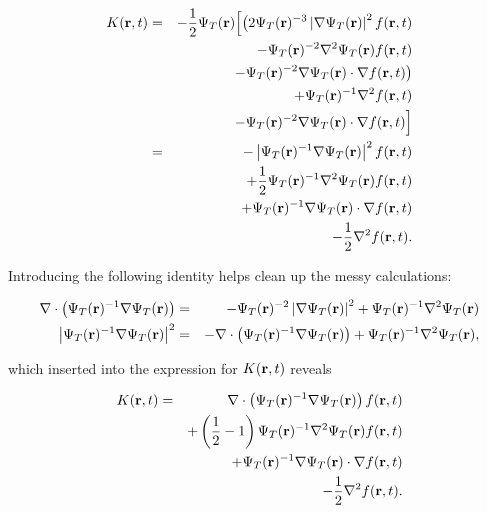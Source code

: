 \begin{eqnarray*}
K(\mathbf{r}, t) &=& -\frac{1}{2}\Psi_T(\mathbf{r})\Big[\big(2\Psi_T(\mathbf{r})^{-3}\left|\nabla\Psi_T(\mathbf{r})\right|^2f(\mathbf{r}, t) \\
        & & - \Psi_T(\mathbf{r})^{-2}\nabla^2\Psi_T(\mathbf{r})f(\mathbf{r}, t) \\
        & & - \Psi_T(\mathbf{r})^{-2}\nabla\Psi_T(\mathbf{r})\cdot\nabla f(\mathbf{r}, t)\big) \\
        & & + \Psi_T(\mathbf{r})^{-1}\nabla^2 f(\mathbf{r}, t) \\
        & & - \Psi_T(\mathbf{r})^{-2}\nabla\Psi_T(\mathbf{r})\cdot\nabla f(\mathbf{r}, t)\Big] \\
        &=& - \left|\Psi_T(\mathbf{r})^{-1}\nabla\Psi_T(\mathbf{r})\right|^2f(\mathbf{r}, t) \\
        & & + \frac{1}{2}\Psi_T(\mathbf{r})^{-1}\nabla^2\Psi_T(\mathbf{r})f(\mathbf{r}, t) \\
        & & + \Psi_T(\mathbf{r})^{-1}\nabla\Psi_T(\mathbf{r})\cdot\nabla f(\mathbf{r}, t) \\
        & & - \frac{1}{2}\nabla^2 f(\mathbf{r}, t). \\
\end{eqnarray*}

Introducing the following identity helps clean up the messy calculations:

\begin{eqnarray*}
 \nabla\cdot\left(\Psi_T(\mathbf{r})^{-1}\nabla\Psi_T(\mathbf{r})\right) &=& -\Psi_T(\mathbf{r})^{-2}\left|\nabla\Psi_T(\mathbf{r})\right|^2 + \Psi_T(\mathbf{r})^{-1}\nabla^2\Psi_T(\mathbf{r}) \\
 \left|\Psi_T(\mathbf{r})^{-1}\nabla\Psi_T(\mathbf{r})\right|^2 &=& -\nabla\cdot\left(\Psi_T(\mathbf{r})^{-1}\nabla\Psi_T(\mathbf{r})\right) + \Psi_T(\mathbf{r})^{-1}\nabla^2\Psi_T(\mathbf{r}),
\end{eqnarray*}

which inserted into the expression for $K(\mathbf{r}, t)$ reveals

\begin{eqnarray*}
K(\mathbf{r}, t) &=&  \nabla\cdot\left(\Psi_T(\mathbf{r})^{-1}\nabla\Psi_T(\mathbf{r})\right)f(\mathbf{r}, t) \\
        & & + \left(\frac{1}{2} - 1\right)\Psi_T(\mathbf{r})^{-1}\nabla^2\Psi_T(\mathbf{r})f(\mathbf{r}, t) \\
        & & + \Psi_T(\mathbf{r})^{-1}\nabla\Psi_T(\mathbf{r})\cdot\nabla f(\mathbf{r}, t) \\
        & & - \frac{1}{2}\nabla^2 f(\mathbf{r}, t). \\
\end{eqnarray*}

